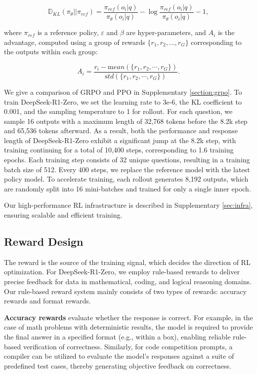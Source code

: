 \begin{equation}
    \mathbb{D}_{KL}\left(\pi_{\theta} || \pi_{ref}\right) = \frac{\pi_{ref}(o_i|q)}{\pi_{\theta}(o_i|q)}- \log\frac{\pi_{ref}(o_i|q)}{\pi_{\theta}(o_i|q)} - 1,
\end{equation}

where $\pi_{ref}$ is a reference policy, $\varepsilon$ and $\beta$ are hyper-parameters, and $A_i$ is the advantage, computed using a group of rewards $\{r_1, r_2, \ldots, r_G\}$ corresponding to the outputs within each group:

\begin{equation}
    A_i = \frac{r_i - {\mathrm mean(\{r_1, r_2, \cdots, r_G\})}}{{\mathrm std(\{r_1, r_2, \cdots, r_G\})}}.
\end{equation}

We give a comparison of GRPO and PPO in Supplementary \ref{section:grpo}.
To train DeepSeek-R1-Zero, we set the learning rate to 3e-6, the KL coefficient to 0.001, and the sampling temperature to 1 for rollout. For each question, we sample 16 outputs with a maximum length of 32,768 tokens before the 8.2k step and 65,536 tokens afterward. As a result, both the performance and response length of DeepSeek-R1-Zero exhibit a significant jump at the 8.2k step, with training continuing for a total of 10,400 steps, corresponding to 1.6 training epochs. Each training step consists of 32 unique questions, resulting in a training batch size of 512. Every 400 steps, we replace the reference model with the latest policy model. To accelerate training, each rollout generates 8,192 outputs, which are randomly split into 16 mini-batches and trained for only a single inner epoch.

Our high-performance RL infrastructure is described in Supplementary \ref{sec:infra}, ensuring scalable and efficient training.
\subsection{Reward Design} 
\label{section:reward}
The reward is the source of the training signal, which decides the direction of RL optimization. For DeepSeek-R1-Zero,  we employ rule-based rewards to deliver precise feedback for data in mathematical, coding, and logical reasoning domains. Our rule-based reward system mainly consists of two types of rewards: accuracy rewards and format rewards.

\textbf{Accuracy rewards} evaluate whether the response is correct. For example, in the case of math problems with deterministic results, the model is required to provide the final answer in a specified format (e.g., within a box), enabling reliable rule-based verification of correctness. Similarly, for code competition prompts, a compiler can be utilized to evaluate the model's responses against a suite of predefined test cases, thereby generating objective feedback on correctness.

